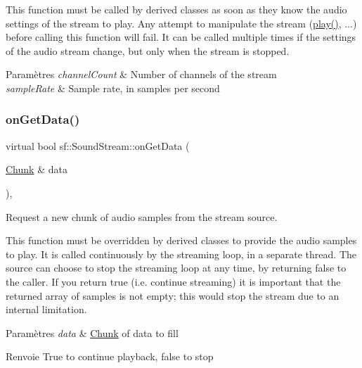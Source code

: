 This function must be called by derived classes as soon as they know the audio settings of the stream to play. Any attempt to manipulate the stream (\hyperlink{classsf_1_1SoundStream_afdc08b69cab5f243d9324940a85a1144}{play()}, ...) before calling this function will fail. It can be called multiple times if the settings of the audio stream change, but only when the stream is stopped.


\begin{DoxyParams}{Paramètres}
{\em channel\+Count} & Number of channels of the stream \\
\hline
{\em sample\+Rate} & Sample rate, in samples per second \\
\hline
\end{DoxyParams}
\mbox{\label{classsf_1_1SoundStream_a968ec024a6e45490962c8a1121cb7c5f}} 
\subsubsection{\texorpdfstring{on\+Get\+Data()}{onGetData()}}
{\footnotesize\ttfamily virtual bool sf\+::\+Sound\+Stream\+::on\+Get\+Data (\begin{DoxyParamCaption}\item[{\hyperlink{structsf_1_1SoundStream_1_1Chunk}{Chunk} \&}]{data }\end{DoxyParamCaption})\hspace{0.3cm}{\ttfamily [protected]}, {}}



Request a new chunk of audio samples from the stream source. 

This function must be overridden by derived classes to provide the audio samples to play. It is called continuously by the streaming loop, in a separate thread. The source can choose to stop the streaming loop at any time, by returning false to the caller. If you return true (i.\+e. continue streaming) it is important that the returned array of samples is not empty; this would stop the stream due to an internal limitation.


\begin{DoxyParams}{Paramètres}
{\em data} & \hyperlink{structsf_1_1SoundStream_1_1Chunk}{Chunk} of data to fill\\
\hline
\end{DoxyParams}
\begin{DoxyReturn}{Renvoie}
True to continue playback, false to stop 
\end{DoxyReturn}


